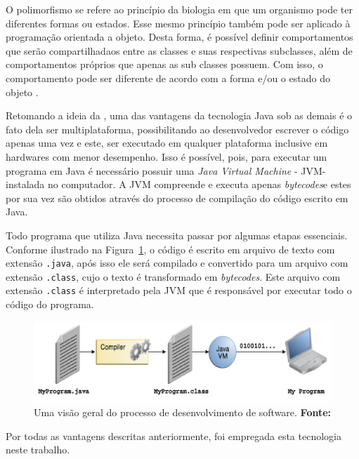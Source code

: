 O polimorfismo se refere ao princípio da biologia em que um organismo pode ter diferentes formas ou estados. Esse mesmo princípio também pode ser aplicado à programação orientada a objeto. Desta forma, é possível definir comportamentos que serão compartilhadaos entre as classes e suas respectivas subclasses, além de comportamentos próprios que apenas as sub classes possuem. Com isso, o comportamento pode ser diferente de acordo com a forma e/ou o estado do objeto \cite{polymorphism_oracle}.

\par Retomando a ideia da , uma das vantagens da tecnologia Java sob as demais é o fato dela ser multiplataforma, possibilitando ao desenvolvedor escrever o código apenas uma vez e este, ser executado em qualquer plataforma inclusive em hardwares com menor desempenho. Isso é possível, pois, para executar um programa em Java é necessário possuir uma \textit{Java Virtual Machine} - JVM\footnotemark[13] - instalada no computador. A JVM compreende e executa apenas \textit{bytecodes}\footnotemark[14] e estes por sua vez são obtidos através do processo de compilação do código escrito em Java.



\par Todo programa que utiliza Java necessita passar por algumas etapas essenciais. Conforme ilustrado na Figura~\ref{fig:processo_compilacao_java}, o código é escrito em arquivo de texto com extensão \texttt{.java}, após isso ele será compilado e convertido para um arquivo com extensão \texttt{.class}, cujo o texto é transformado em \textit{bytecodes}. Este arquivo com extensão \texttt{.class} é interpretado pela JVM que é responsável por executar todo o código do programa.

\begin{figure}[h!]
	\centerline{\includegraphics[scale=1]{./imagens/processo_compilacao_java.png}}
	\caption[Uma visão geral do processo de desenvolvimento de software.]
	{Uma visão geral do processo de desenvolvimento de software. \textbf{Fonte:} }
	\label{fig:processo_compilacao_java}
\end{figure}

\par Por todas as vantagens descritas anteriormente, foi empregada esta tecnologia neste trabalho.
